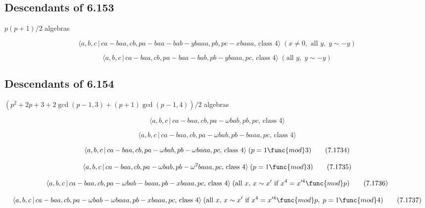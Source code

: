 \documentclass[10pt]{article}
\begin{document}
\subsection{Descendants of 6.153}

$p(p+1)/2$ algebras

\begin{equation}
\langle a,b,c\,|\,ca-baa,cb,pa-baa-bab-ybaaa,pb,pc-xbaaa,\,\text{class }%
4\rangle \;(x\neq 0,\text{ all }y,\;y\sim -y)  \tag{7.1730}
\end{equation}

\begin{equation}
\langle a,b,c\,|\,ca-baa,cb,pa-baa-bab,pb-ybaaa,pc,\,\text{class }4\rangle
\;(\text{all }y,\;y\sim -y)  \tag{7.1731}
\end{equation}

\subsection{Descendants of 6.154}

$(p^{2}+2p+3+2\gcd (p-1,3)+(p+1)\gcd (p-1,4))/2$ algebras

\begin{equation}
\langle a,b,c\,|\,ca-baa,cb,pa-\omega bab,pb,pc,\,\text{class }4\rangle 
\tag{7.1732}
\end{equation}

\begin{equation}
\langle a,b,c\,|\,ca-baa,cb,pa-\omega bab,pb-baaa,pc,\,\text{class }4\rangle
\tag{7.1733}
\end{equation}

\begin{equation}
\langle a,b,c\,|\,ca-baa,cb,pa-\omega bab,pb-\omega baaa,pc,\,\text{class }%
4\rangle \;(p=1\func{mod}3)  \tag{7.1734}
\end{equation}

\begin{equation}
\langle a,b,c\,|\,ca-baa,cb,pa-\omega bab,pb-\omega ^{2}baaa,pc,\,\text{%
class }4\rangle \;(p=1\func{mod}3)  \tag{7.1735}
\end{equation}

\begin{equation}
\langle a,b,c\,|\,ca-baa,cb,pa-\omega bab-baaa,pb-xbaaa,pc,\,\text{class }%
4\rangle \;(\text{all }x,\,x\sim x^{\prime}\text{ if }x^4=x^{\prime 4}\func{%
mod}p)  \tag{7.1736}
\end{equation}

\begin{equation}
\langle a,b,c\,|\,ca-baa,cb,pa-\omega bab-\omega baaa,pb-xbaaa,pc,\,\text{%
class }4\rangle \;(\text{all }x,\,x\sim x^{\prime}\text{ if }x^4=x^{\prime 4}%
\func{mod}p,\;p=1\func{mod}4)  \tag{7.1737}
\end{equation}
\end{document}
